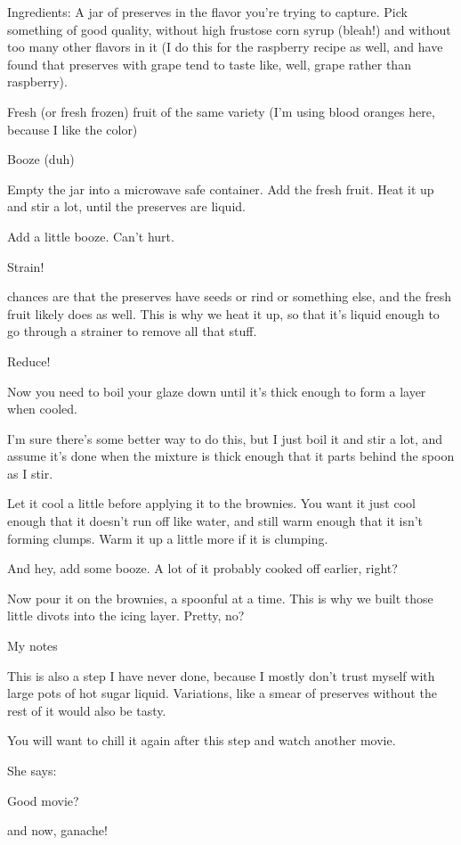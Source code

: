 Ingredients:
A jar of preserves in the flavor you're trying to capture. Pick something of good quality, without high frustose corn syrup (bleah!) and without too many other flavors in it (I do this for the raspberry recipe as well, and have found that preserves with grape tend to taste like, well, grape rather than raspberry).

Fresh (or fresh frozen) fruit of the same variety (I'm using blood oranges here, because I like the color)

Booze (duh)

Empty the jar into a microwave safe container. Add the fresh fruit. Heat it up and stir a lot, until the preserves are liquid.

Add a little booze. Can't hurt.

Strain!

chances are that the preserves have seeds or rind or something else, and the fresh fruit likely does as well. This is why we heat it up, so that it's liquid enough to go through a strainer to remove all that stuff.

Reduce!

Now you need to boil your glaze down until it's thick enough to form a layer when cooled.

I'm sure there's some better way to do this, but I just boil it and stir a lot, and assume it's done when the mixture is thick enough that it parts behind the spoon as I stir.

Let it cool a little before applying it to the brownies. You want it just cool enough that it doesn't run off like water, and still warm enough that it isn't forming clumps. Warm it up a little more if it is clumping.

And hey, add some booze. A lot of it probably cooked off earlier, right?

Now pour it on the brownies, a spoonful at a time. This is why we built those little divots into the icing layer. Pretty, no?

My notes

This is also a step I have never done, because I mostly don't trust myself with large pots of hot sugar liquid. Variations, like a smear of preserves without the rest of it would also be tasty.

You will want to chill it again after this step and watch another movie.

She says:

Good movie?

and now, ganache!

